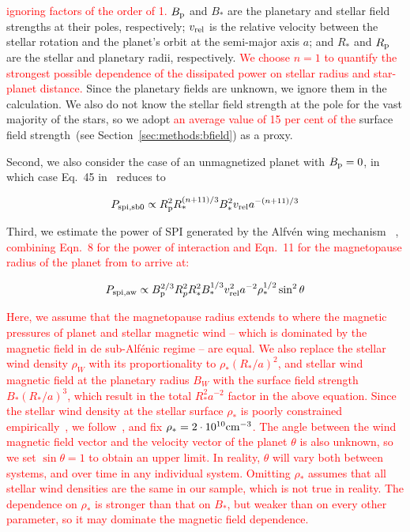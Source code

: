 \documentclass[twocolumn]{aastex631}
\begin{document}
\textcolor{red}{ignoring factors of the order of 1.}  $B_{\rm p}$ and $B_*$ are the planetary and stellar field strengths at their poles, respectively; $v_{\rm rel}$ is the relative velocity between the stellar rotation and the planet's orbit at the semi-major axis $a$; and $R_*$ and $R_{\rm p}$ are the stellar and planetary radii, respectively. \textcolor{red}{We choose $n=1$ to quantify the strongest possible dependence of the dissipated power on stellar radius and star-planet distance.} Since the planetary fields are unknown, we ignore them in the calculation. We also do not know the stellar field strength at the pole for the vast majority of the stars, so we adopt \textcolor{red}{an average value of 15 per cent of the} surface field strength~(see Section~\ref{sec:methods:bfield}) as a proxy.

Second, we also consider the case of an unmagnetized planet with $B_{\rm p}=0$, in which case Eq.~45 in~\cite{lanza2012starplanet} reduces to

\begin{equation}
    P_{\rm spi,sb0} \propto R_{\rm p}^2 R_*^{(n+11) / 3} B_*^2 v_{\rm rel}    a^{-(n+11) / 3} 
\end{equation}

Third, we estimate the power of SPI generated by the Alfv\'en wing mechanism ~\citep{saur2013magnetic,kavanagh2022radio},\textcolor{red}{ combining Eqn.~8 for the power of interaction and Eqn.~11 for the magnetopause radius of the planet from\citet{kavanagh2022radio} to arrive at:}

\begin{equation}
    P_{\rm spi,aw} \propto B_{\rm p}^{2/3} R_{p}^2  R_*^2  B_*^{1/3}  v_{\rm rel}^2 a^{-2} \rho_*^{1/2} \sin^2 \theta
\end{equation}

\textcolor{red}{Here, we assume that the magnetopause radius extends to where the magnetic pressures of planet and stellar magnetic wind -- which is dominated by the magnetic field in de sub-Alf\'enic regime -- are equal. We also replace the stellar wind density $\rho_W$ with its proportionality to $\rho_* (R_* / a)^{2}$, and stellar wind magnetic field at the planetary radius $B_W$ with the surface field strength $B_* (R_* / a)^{3}$, which result in the total $R_*^2 a^{-2}$ factor in the above equation. Since the stellar wind density at the stellar surface $\rho_*$ is poorly constrained empirically~\citep{vidotto2021evolution}, we follow~\citet{alvarado-gomez2020tuning,kavanagh2021planetinduced}, and fix $\rho_*=2\cdot10^{10}\rm{cm}^{-3}$. The angle between the wind magnetic field vector and the velocity vector of the planet $\theta$ is also unknown, so we set $\sin\theta=1$ to obtain an upper limit. In reality, $\theta$ will vary both between systems, and over time in any individual system. Omitting $\rho_*$ assumes that all stellar wind densities are the same in our sample, which is not true in reality. The dependence on $\rho_*$ is stronger than that on $B_*$, but weaker than on every other parameter, so it may dominate the magnetic field dependence.}
\end{document}
